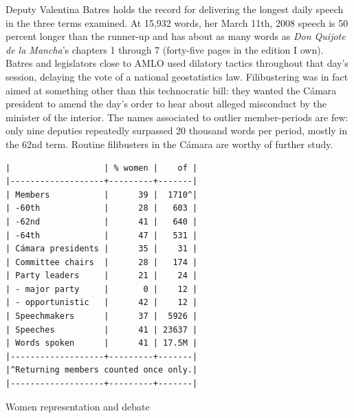 \documentclass[letter,12pt]{article}
\begin{document}
Deputy Valentina Batres holds the record for delivering the longest daily speech in the three terms examined. At 15,932 words, her March 11th, 2008 speech is 50 percent longer than the runner-up and has about as many words as \emph{Don Quijote de la Mancha}'s chapters 1 through 7 (forty-five pages in the edition I own). Batres and legislators close to AMLO used dilatory tactics throughout that day's session, delaying the vote of a national geostatistics law. Filibustering was in fact aimed at something other than this technocratic bill: they wanted the Cámara president to amend the day's order to hear about alleged misconduct by the minister of the interior. The names associated to outlier member-periods are few: only nine deputies repeatedly surpassed 20 thousand words per period, mostly in the 62nd term. Routine filibusters in the Cámara are worthy of further study. 




\begin{table}
  \begin{scriptsize}
    \begin{verbatim}
|                   | % women |    of |
|-------------------+---------+-------|
| Members           |      39 |  1710^|
| -60th             |      28 |   603 |
| -62nd             |      41 |   640 |
| -64th             |      47 |   531 |
| Cámara presidents |      35 |    31 |
| Committee chairs  |      28 |   174 |
| Party leaders     |      21 |    24 |
| - major party     |       0 |    12 |
| - opportunistic   |      42 |    12 |
| Speechmakers      |      37 |  5926 |
| Speeches          |      41 | 23637 |
| Words spoken      |      41 | 17.5M |
|-------------------+---------+-------|
|^Returning members counted once only.|
|-------------------+---------+-------|
    \end{verbatim}
  \end{scriptsize}
\caption{Women representation and debate}\label{T:women}
\end{table}
\end{document}
